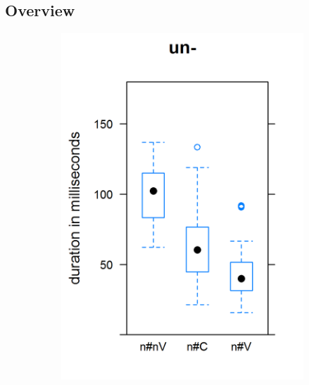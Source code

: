 \subsection{Overview}\label{overview corpus}



\begin{figure}[t!]
	
		
		
		\begin{subfigure}
			\centering
			\includegraphics[scale=.55]{images/Corpus/boxUn.png}
		\end{subfigure}%
		~
		\begin{subfigure}
			\centering

\end{subfigure}
\end{figure}
